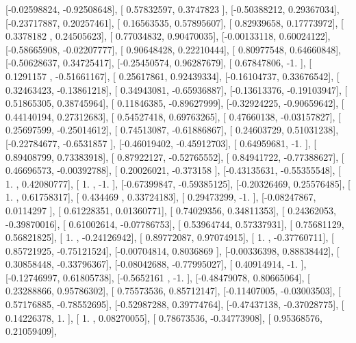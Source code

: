 \documentclass{article}
\begin{document}
       [-0.02598824, -0.92508648],
       [ 0.57832597,  0.3747823 ],
       [-0.50388212,  0.29367034],
       [-0.23717887,  0.20257461],
       [ 0.16563535,  0.57895607],
       [ 0.82939658,  0.17773972],
       [ 0.3378182 ,  0.24505623],
       [ 0.77034832,  0.90470035],
       [-0.00133118,  0.60024122],
       [-0.58665908, -0.02207777],
       [ 0.90648428,  0.22210444],
       [ 0.80977548,  0.64660848],
       [-0.50628637,  0.34725417],
       [-0.25450574,  0.96287679],
       [ 0.67847806, -1.        ],
       [ 0.1291157 , -0.51661167],
       [ 0.25617861,  0.92439334],
       [-0.16104737,  0.33676542],
       [ 0.32463423, -0.13861218],
       [ 0.34943081, -0.65936887],
       [-0.13613376, -0.19103947],
       [ 0.51865305,  0.38745964],
       [ 0.11846385, -0.89627999],
       [-0.32924225, -0.90659642],
       [ 0.44140194,  0.27312683],
       [ 0.54527418,  0.69763265],
       [ 0.47660138, -0.03157827],
       [ 0.25697599, -0.25014612],
       [ 0.74513087, -0.61886867],
       [ 0.24603729,  0.51031238],
       [-0.22784677, -0.6531857 ],
       [-0.46019402, -0.45912703],
       [ 0.64959681, -1.        ],
       [ 0.89408799,  0.73383918],
       [ 0.87922127, -0.52765552],
       [ 0.84941722, -0.77388627],
       [ 0.46696573, -0.00392788],
       [ 0.20026021, -0.373158  ],
       [-0.43135631, -0.55355548],
       [ 1.        ,  0.42080777],
       [ 1.        , -1.        ],
       [-0.67399847, -0.59385125],
       [-0.20326469,  0.25576485],
       [ 1.        ,  0.61758317],
       [ 0.434469  ,  0.33724183],
       [ 0.29473299, -1.        ],
       [-0.08247867,  0.0114297 ],
       [ 0.61228351,  0.01360771],
       [ 0.74029356,  0.34811353],
       [ 0.24362053, -0.39870016],
       [ 0.61002614, -0.07786753],
       [ 0.53964744,  0.57337931],
       [ 0.75681129,  0.56821825],
       [ 1.        , -0.24126942],
       [ 0.89772087,  0.97074915],
       [ 1.        , -0.37760711],
       [ 0.85721925, -0.75121524],
       [-0.00704814,  0.8036869 ],
       [-0.00336398,  0.88838442],
       [ 0.30858448, -0.33796367],
       [-0.08042688, -0.77995027],
       [ 0.40914914, -1.        ],
       [-0.12746997,  0.61805738],
       [-0.5652161 , -1.        ],
       [-0.48479078,  0.80665064],
       [ 0.23288866,  0.95786302],
       [ 0.75573536,  0.85712147],
       [-0.11407005, -0.03003503],
       [ 0.57176885, -0.78552695],
       [-0.52987288,  0.39774764],
       [-0.47437138, -0.37028775],
       [ 0.14226378,  1.        ],
       [ 1.        ,  0.08270055],
       [ 0.78673536, -0.34773908],
       [ 0.95368576,  0.21059409],
\end{document}

